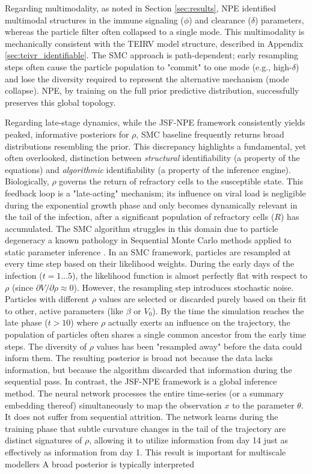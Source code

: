 \documentclass{article}
\begin{document}
Regarding multimodality, as noted in Section \ref{sec:results}, NPE identified multimodal structures in the immune signaling ($\phi$) and clearance ($\delta$) parameters, whereas the particle filter often collapsed to a single mode. This multimodality is mechanically consistent with the TEIRV model structure, described in Appendix \ref{sec:teivr_identifiable}. The SMC approach is path-dependent; early resampling steps often cause the particle population to "commit" to one mode (e.g., high-$\delta$) and lose the diversity required to represent the alternative mechanism (mode collapse). NPE, by training on the full prior predictive distribution, successfully preserves this global topology.





Regarding late-stage dynamics, while the JSF-NPE framework consistently yields peaked, informative posteriors for $\rho$, SMC baseline frequently returns broad distributions resembling the prior. This discrepancy highlights a fundamental, yet often overlooked, distinction between \textit{structural} identifiability (a property of the equations) and \textit{algorithmic} identifiability (a property of the inference engine). Biologically, $\rho$ governs the return of refractory cells to the susceptible state. This feedback loop is a "late-acting" mechanism; its influence on viral load is negligible during the exponential growth phase and only becomes dynamically relevant in the tail of the infection, after a significant population of refractory cells ($R$) has accumulated. The SMC algorithm struggles in this domain due to particle degeneracy a known pathology in Sequential Monte Carlo methods applied to static parameter inference \cite{Andrieu2010, Kantas2009}. In an SMC framework, particles are resampled at every time step based on their likelihood weights. During the early days of the infection ($t=1 \dots 5$), the likelihood function is almost perfectly flat with respect to $\rho$ (since $\partial V / \partial \rho \approx 0$). However, the resampling step introduces stochastic noise. Particles with different $\rho$ values are selected or discarded purely based on their fit to other, active parameters (like $\beta$ or $V_0$). By the time the simulation reaches the late phase ($t > 10$) where $\rho$ actually exerts an influence on the trajectory, the population of particles often shares a single common ancestor from the early time steps. The diversity of $\rho$ values has been "resampled away" before the data could inform them. The resulting posterior is broad not because the data lacks information, but because the algorithm discarded that information during the sequential pass. In contrast, the JSF-NPE framework is a global inference method. The neural network processes the entire time-series (or a summary embedding thereof) simultaneously to map the observation $x$ to the parameter $\theta$. It does not suffer from sequential attrition. The network learns during the training phase that subtle curvature changes in the tail of the trajectory are distinct signatures of $\rho$, allowing it to utilize information from day 14 just as effectively as information from day 1. This result is important for multiscale modellers  A broad posterior is typically interpreted 
\end{document}
